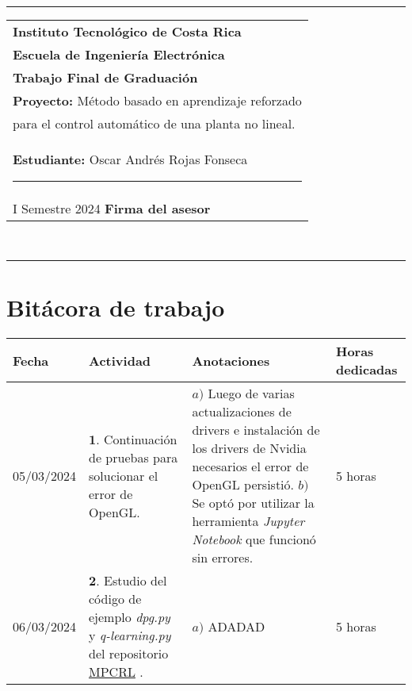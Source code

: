 \documentclass[12pt]{article}
\begin{document}
\hfill\\
\rule{\textwidth}{1.5pt}

\begin{minipage}[t]{85mm}
  \begin{tabular}{l}
    \textbf{\large Instituto Tecnológico de Costa Rica} \\  
    \textbf{Escuela de Ingeniería Electrónica} \\
    \textbf{Trabajo Final de Graduación} \\
    \textbf{Proyecto:} Método basado en aprendizaje reforzado \\para el control automático de una planta no lineal. \\
    \textbf{Estudiante:} Oscar Andrés Rojas Fonseca \hspace{3cm}\rule{4.5cm}{1.5pt}\\
    I Semestre 2024 \hspace{8.5cm}\textbf{Firma del asesor}
  \end{tabular}
\end{minipage}
\hfill\\
\rule{\textwidth}{1.5pt}


\section*{Bitácora de trabajo}

\begin{minipage}[h]{\textwidth}
	\centering
	\begin{tabularx}{\textwidth}{|p{2cm}|X|X|p{2cm}|} 
		\hline
		\rowcolor{encabezado}
		\textbf{Fecha} & 
		\textbf{Actividad} & 
		\textbf{Anotaciones} & 
		\textbf{Horas dedicadas} \\ \hline
		05/03/2024 & 
		$\mathbf{1}.$ Continuación de pruebas para solucionar el error de OpenGL. & 
		$a)$ Luego de varias actualizaciones de drivers e instalación de los drivers de Nvidia necesarios el error de OpenGL persistió. \newline 
		$b)$ Se optó por utilizar la herramienta \textit{Jupyter Notebook} que funcionó sin errores. \newline & 
		5 horas \\
	 	06/03/2024 & 
	 	$\mathbf{2}.$ Estudio del código de ejemplo \textit{dpg.py} y \textit{q-learning.py} del repositorio \href{https://github.com/FilippoAiraldi/mpc-reinforcement-learning/tree/main}{MPCRL} \cite{Airdaldi2023}. & 
	 	$a)$ ADADAD \newline & 
	 	5 horas \\
	 	
	 	\hline
	\end{tabularx}
\end{minipage}	 	
	 	
\end{document}
